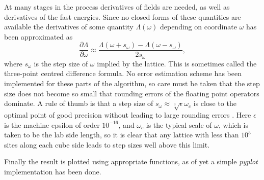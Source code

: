 \documentclass[main.tex]{subfiles}
\begin{document}
At many stages in the process derivatives of fields are needed, as well as derivatives of
the fast energies. Since no closed forms of these quantities are available the derivatives
of some quantity \(\Lambda (\omega)\) depending on coordinate \(\omega\) has been
approximated as \[
\frac{\partial \Lambda}{\partial \omega} \approx \frac{\Lambda(\omega + s_\omega) -
\Lambda(\omega - s_\omega)}{2s_\omega}
,\] 
where \(s_\omega\) is the step size of \(\omega\) implied by the lattice.
This is sometimes called the three-point centred difference formula. No error estimation scheme
has been implemented for these parts of the algorithm, so care must be taken that the step size does not
become so small that rounding errors of the floating point operators dominate.
A rule of thumb is that a step size of \(s_\omega \approx \sqrt[3]{\epsilon}\omega_c\) is
close to the optimal point of good precision without leading to large rounding
errors \cite{numerical}. Here \(\epsilon\) is the machine
epsilon of order \(10^{-16}\), and \(\omega_c\) is the typical scale of \(\omega\), which
is taken to be the lab side length, so it is clear that any lattice with less than \(10^5\) sites
along each cube side leads to step sizes well above this limit.

Finally the result is plotted using appropriate functions, as of yet a simple
\textit{pyplot} implementation has been done.
\end{document}
